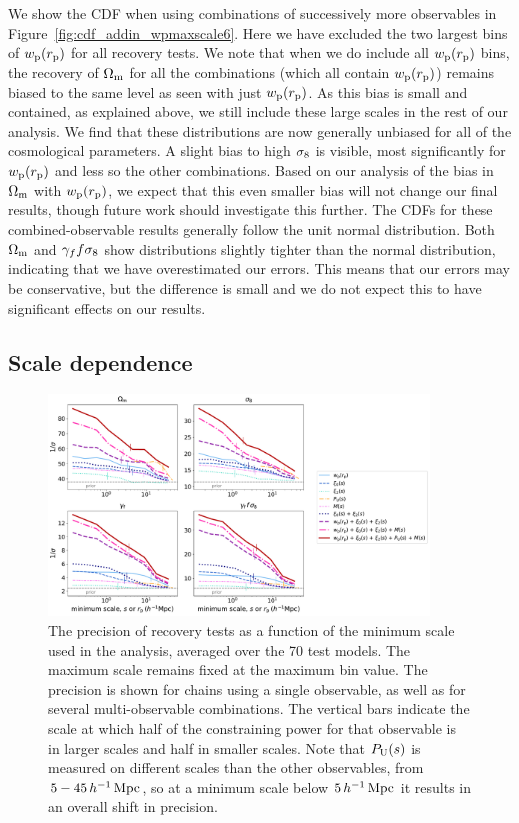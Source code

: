 We show the CDF when using combinations of successively more observables in Figure~\ref{fig:cdf_addin_wpmaxscale6}.
Here we have excluded the two largest bins of $w_\mathrm{p}(r_\mathrm{p})$ for all recovery tests.
We note that when we do include all $w_\mathrm{p}(r_\mathrm{p})$ bins, the recovery of $\Omega_\mathrm{m}$ for all the combinations (which all contain $w_\mathrm{p}(r_\mathrm{p})$) remains biased to the same level as seen with just $w_\mathrm{p}(r_\mathrm{p})$.
As this bias is small and contained, as explained above, we still include these large scales in the rest of our analysis.
We find that these distributions are now generally unbiased for all of the cosmological parameters.
A slight bias to high $\sigma_\mathrm{8}$ is visible, most significantly for $w_\mathrm{p}(r_\mathrm{p})$ and less so the other combinations.
Based on our analysis of the bias in $\Omega_\mathrm{m}$ with $w_\mathrm{p}(r_\mathrm{p})$, we expect that this even smaller bias will not change our final results, though future work should investigate this further.
The CDFs for these combined-observable results generally follow the unit normal distribution.
Both $\Omega_\mathrm{m}$ and $\gamma_f f\sigma_8$ show distributions slightly tighter than the normal distribution, indicating that we have overestimated our errors.
This means that our errors may be conservative, but the difference is small and we do not expect this to have significant effects on our results.



\subsection{Scale dependence}
\label{sec:scaledep}

\begin{figure}
\centering
\includegraphics[width=0.9\textwidth]{scale_dependence}
\caption{The precision of recovery tests as a function of the minimum scale used in the analysis, averaged over the 70 test models. The maximum scale remains fixed at the maximum bin value. The precision is shown for chains using a single observable, as well as for several multi-observable combinations. The vertical bars indicate the scale at which half of the constraining power for that observable is in larger scales and half in smaller scales. Note that $P_\mathrm{U}(s)$ is measured on different scales than the other observables, from $5-45 \, h^{-1}\,\mathrm{Mpc}$, so at a minimum scale below $5 \, h^{-1}\,\mathrm{Mpc}$ it results in an overall shift in precision.}
\label{fig:scale_dependence}
\end{figure}

